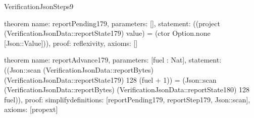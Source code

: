 \begin{lexlean}{VerificationJsonSteps9}
\begin{semanticmodule}
theorem{
  name: reportPending179,
  parameters: [],
  statement: ((project (VerificationJsonData::reportState179) value) = (ctor Option.none [Json::Value])),
  proof: reflexivity{},
  axioms: []
}

theorem{
  name: reportAdvance179,
  parameters: [fuel : Nat],
  statement: ((Json::scan (VerificationJsonData::reportBytes) (VerificationJsonData::reportState179) 128 (fuel + 1)) = (Json::scan (VerificationJsonData::reportBytes) (VerificationJsonData::reportState180) 128 fuel)),
  proof: simplify{definitions: [reportPending179, reportStep179, Json::scan]},
  axioms: [propext]
}

\end{semanticmodule}
\end{lexlean}
